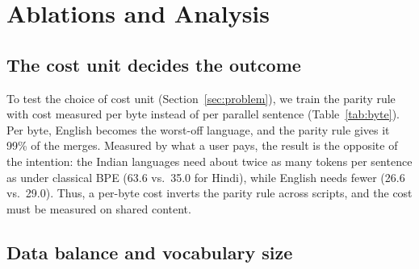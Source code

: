 \section{Ablations and Analysis}
\label{sec:ablation}


\subsection{The cost unit decides the outcome}
\label{sec:unitresult}

To test the choice of cost unit (Section~\ref{sec:problem}), we train the parity rule with
cost measured per byte instead of per parallel sentence (Table~\ref{tab:byte}). Per byte,
English becomes the worst-off language, and the parity rule gives it 99\% of the merges.
Measured by what a user pays, the result is the opposite of the intention: the Indian
languages need about twice as many tokens per sentence as under classical BPE (63.6 vs.\
35.0 for Hindi), while English needs fewer (26.6 vs.\ 29.0). Thus, a per-byte cost inverts
the parity rule across scripts, and the cost must be measured on shared content.

\begin{table}[t]
\centering
\small
{}
\caption{Tokens per sentence on devtest when the training cost is measured per byte
(single run) or per parallel sentence (five-sample mean, Table~\ref{tab:perlang}).}
\label{tab:byte}
\end{table}

\subsection{Data balance and vocabulary size}
\label{sec:sens}

